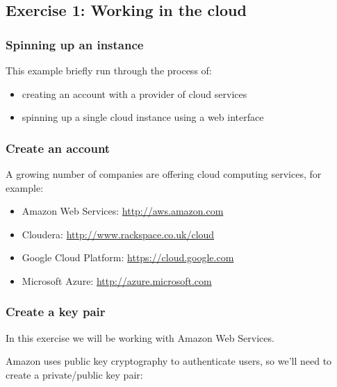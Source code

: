 \subsection{Exercise 1: Working in the
cloud}\label{exercise-1-working-in-the-cloud}

\subsubsection{Spinning up an instance}\label{spinning-up-an-instance}

This example briefly run through the process of:

\begin{itemize}
\itemsep1pt\parskip0pt
\item
  creating an account with a provider of cloud services
\item
  spinning up a single cloud instance using a web interface
\end{itemize}

\subsubsection{Create an account}\label{create-an-account}

A growing number of companies are offering cloud computing services, for
example:

\begin{itemize}
\itemsep1pt\parskip0pt
\item
  Amazon Web Services: \url{http://aws.amazon.com}
\item
  Cloudera: \url{http://www.rackspace.co.uk/cloud}
\item
  Google Cloud Platform: \url{https://cloud.google.com}
\item
  Microsoft Azure: \url{http://azure.microsoft.com}
\end{itemize}

\subsubsection{Create a key pair}\label{create-a-key-pair}

In this exercise we will be working with Amazon Web Services.

Amazon uses public key cryptography to authenticate users, so we'll need
to create a private/public key pair:

\begin{Shaded}
\begin{Highlighting}[]
\NormalTok{$ } 
\end{Highlighting}
\end{Shaded}


